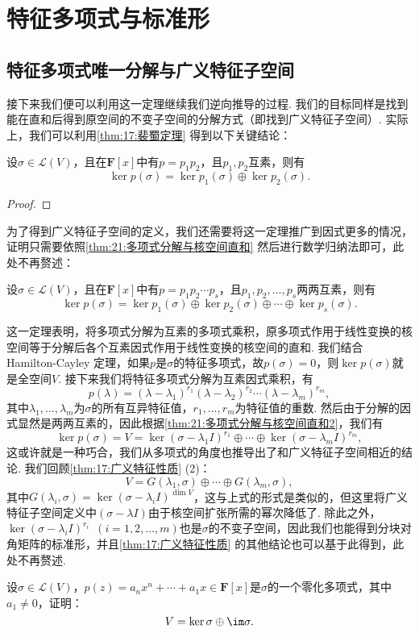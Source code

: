 \section{特征多项式与标准形}
\subsection{特征多项式唯一分解与广义特征子空间}
接下来我们便可以利用这一定理继续我们逆向推导的过程. 我们的目标同样是找到能在直和后得到原空间的不变子空间的分解方式（即找到广义特征子空间）. 实际上，我们可以利用\autoref{thm:17:裴蜀定理} 得到以下关键结论：
\begin{theorem} \label{thm:21:多项式分解与核空间直和}
    设$\sigma\in \mathcal{L}(V)$，且在$\mathbf{F}[x]$中有$p=p_1p_2$，且$p_1,p_2$互素，则有
    \[\ker p(\sigma)=\ker p_1(\sigma)\oplus\ker p_2(\sigma).\]
\end{theorem}

\begin{proof}

\end{proof}

为了得到广义特征子空间的定义，我们还需要将这一定理推广到因式更多的情况，证明只需要依照\autoref{thm:21:多项式分解与核空间直和} 然后进行数学归纳法即可，此处不再赘述：
\begin{theorem} \label{thm:21:多项式分解与核空间直和2}
    设$\sigma\in \mathcal{L}(V)$，且在$\mathbf{F}[x]$中有$p=p_1p_2\cdots p_s$，且$p_1,p_2,\ldots,p_s$两两互素，则有\[\ker p(\sigma)=\ker p_1(\sigma)\oplus\ker p_2(\sigma)\oplus\cdots\oplus\ker p_s(\sigma).\]
\end{theorem}

这一定理表明，将多项式分解为互素的多项式乘积，原多项式作用于线性变换的核空间等于分解后各个互素因式作用于线性变换的核空间的直和. 我们结合 Hamilton-Cayley 定理，如果$p$是$\sigma$的特征多项式，故$p(\sigma)=0$，则$\ker p(\sigma)$就是全空间$V$. 接下来我们将特征多项式分解为互素因式乘积，有
\[p(\lambda)=(\lambda-\lambda_1)^{r_1}(\lambda-\lambda_2)^{r_2}\cdots(\lambda-\lambda_m)^{r_m},\]
其中$\lambda_1,\ldots,\lambda_m$为$\sigma$的所有互异特征值，$r_1,\ldots,r_m$为特征值的重数. 然后由于分解的因式显然是两两互素的，因此根据\autoref{thm:21:多项式分解与核空间直和2}，我们有
\[\ker p(\sigma)=V=\ker (\sigma-\lambda_1I)^{r_1}\oplus\cdots\oplus\ker (\sigma-\lambda_mI)^{r_m},\]
这或许就是一种巧合，我们从多项式的角度也推导出了和广义特征子空间相近的结论. 我们回顾\autoref{thm:17:广义特征性质} (2)：
\[V=G(\lambda_1,\sigma)\oplus\cdots\oplus G(\lambda_m,\sigma),\]
其中$G(\lambda_i,\sigma)=\ker (\sigma-\lambda_iI)^{\dim V}$，这与上式的形式是类似的，但这里将广义特征子空间定义中$(\sigma-\lambda I)$由于核空间扩张所需的幂次降低了. 除此之外，$\ker (\sigma-\lambda_iI)^{r_i}\enspace(i=1,2,\ldots,m)$也是$\sigma$的不变子空间，因此我们也能得到分块对角矩阵的标准形，并且\autoref{thm:17:广义特征性质} 的其他结论也可以基于此得到，此处不再赘述.
\begin{example}
    设$\sigma\in \mathcal{L}(V)$，$p(z)=a_nx^n+\cdots+a_1x\in\mathbf{F}[x]$是$\sigma$的一个零化多项式，其中$a_1\neq 0$，证明：
    \[V=\ker \sigma\oplus\im\sigma.\]
\end{example}

